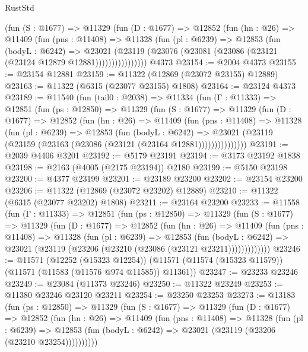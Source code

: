 \begin{lexlean}{RustStd}
\begin{coremodule}
            (fun (S : @1677) =>
            @11329
              (fun (D : @1677) =>
              @12852
                (fun (hn : @26) =>
                @11409
                  (fun (pns : @11408) =>
                  @11328
                    (fun (pl : @6239) =>
                    @12853
                      (fun (bodyL : @6242) =>
                      @23021
                        (@23119
                          (@23076 (@23081 (@23086 (@23121 (@23124 @12879 @12881))))))))))))))))
    @4373
@23154 := @2004 @4373
@23155 := @23154 @12881
@23159 := @11322 (@12869 (@23072 @23155) @12889)
@23163 := @11322 (@6315 (@23077 @23155) @1808)
@23164 := @23124 @4373
@23189 := @11540
    (fun (tail0 : @2038) =>
    @11334
      (fun (Γ : @11333) =>
      @12851
        (fun (ps : @12850) =>
        @11329
          (fun (S : @1677) =>
          @11329
            (fun (D : @1677) =>
            @12852
              (fun (hn : @26) =>
              @11409
                (fun (pns : @11408) =>
                @11328
                  (fun (pl : @6239) =>
                  @12853
                    (fun (bodyL : @6242) =>
                    @23021 (@23119 (@23159 (@23163 (@23086 (@23121 (@23164 @12881)))))))))))))))
@23191 := @2039 @4406 @3201
@23192 := @5179 @23191
@23194 := @3173 @23192 @1838
@23198 := @2163 (@4005 (@2175 @23194)) @2180
@23199 := @5150 @23198
@23200 := @4377 @23199
@23201 := @23189 @23200
@23202 := @23154 @23200
@23206 := @11322 (@12869 (@23072 @23202) @12889)
@23210 := @11322 (@6315 (@23077 @23202) @1808)
@23211 := @23164 @23200
@23233 := @11558
    (fun (Γ : @11333) =>
    @12851
      (fun (ps : @12850) =>
      @11329
        (fun (S : @1677) =>
        @11329
          (fun (D : @1677) =>
          @12852
            (fun (hn : @26) =>
            @11409
              (fun (pns : @11408) =>
              @11328
                (fun (pl : @6239) =>
                @12853
                  (fun (bodyL : @6242) =>
                  @23021 (@23119 (@23206 (@23210 (@23086 (@23121 @23211)))))))))))))
@23246 := @11571
    (@12252 (@15323 @12254))
    (@11571 (@11574 (@15323 @11579)) (@11571 (@11583 (@11576 @974 @11585)) @11361))
@23247 := @23233 @23246
@23249 := @23084 (@11373 @23246)
@23250 := @11322 @23249
@23253 := @11380 @23246 @23120 @23211
@23254 := @23250 @23253
@23273 := @13183
    (fun (ps : @12850) =>
    @11329
      (fun (S : @1677) =>
      @11329
        (fun (D : @1677) =>
        @12852
          (fun (hn : @26) =>
          @11409
            (fun (pns : @11408) =>
            @11328
              (fun (pl : @6239) =>
              @12853 (fun (bodyL : @6242) => @23021 (@23119 (@23206 (@23210 @23254))))))))))

\end{coremodule}
\end{lexlean}
